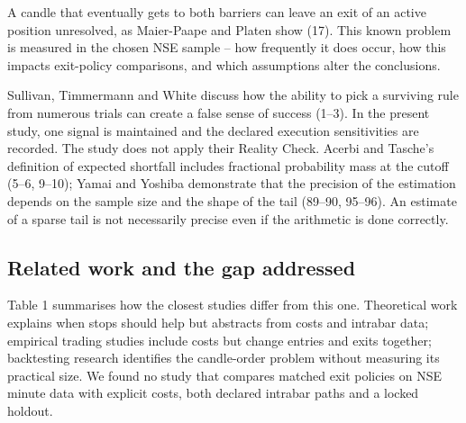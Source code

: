 \documentclass[11pt,a4paper]{article}
\begin{document}
A candle that eventually gets to both barriers can leave an exit of an active position unresolved, as Maier-Paape and Platen show (17). This known problem is measured in the chosen NSE sample -- how frequently it does occur, how this impacts exit-policy comparisons, and which assumptions alter the conclusions.

Sullivan, Timmermann and White discuss how the ability to pick a surviving rule from numerous trials can create a false sense of success (1--3). In the present study, one signal is maintained and the declared execution sensitivities are recorded. The study does not apply their Reality Check. Acerbi and Tasche's definition of expected shortfall includes fractional probability mass at the cutoff (5--6, 9--10); Yamai and Yoshiba demonstrate that the precision of the estimation depends on the sample size and the shape of the tail (89--90, 95--96). An estimate of a sparse tail is not necessarily precise even if the arithmetic is done correctly.

\subsection*{Related work and the gap addressed}

Table 1 summarises how the closest studies differ from this one. Theoretical work explains when stops should help but abstracts from costs and intrabar data; empirical trading studies include costs but change entries and exits together; backtesting research identifies the candle-order problem without measuring its practical size. We found no study that compares matched exit policies on NSE minute data with explicit costs, both declared intrabar paths and a locked holdout.
\end{document}
